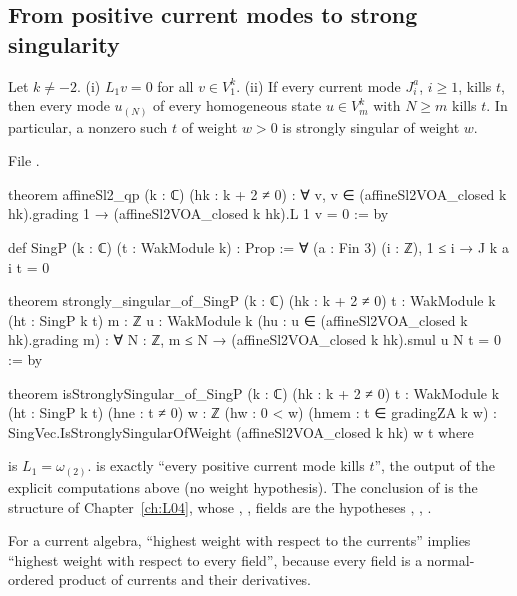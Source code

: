 \subsection{From positive current modes to strong singularity}

\begin{theorem}\label{l08:thm:strong}
Let $k\ne-2$. (i) $L_1v = 0$ for all $v\in V^k_1$. (ii) If every current mode $J^a_i$, $i\ge1$, kills $t$,
then every mode $u_{(N)}$ of every homogeneous state $u\in V^k_m$ with $N\ge m$ kills $t$. In particular,
a nonzero such $t$ of weight $w>0$ is strongly singular of weight $w$.
\end{theorem}

\noindent File .
\begin{leancode}
theorem affineSl2_qp (k : ℂ) (hk : k + 2 ≠ 0) :
    ∀ v, v ∈ (affineSl2VOA_closed k hk).grading 1 → (affineSl2VOA_closed k hk).L 1 v = 0 := by

def SingP (k : ℂ) (t : WakModule k) : Prop := ∀ (a : Fin 3) (i : ℤ), 1 ≤ i → J k a i t = 0

theorem strongly_singular_of_SingP (k : ℂ) (hk : k + 2 ≠ 0) {t : WakModule k} (ht : SingP k t)
    {m : ℤ} {u : WakModule k} (hu : u ∈ (affineSl2VOA_closed k hk).grading m) :
    ∀ N : ℤ, m ≤ N → (affineSl2VOA_closed k hk).smul u N t = 0 := by

theorem isStronglySingular_of_SingP (k : ℂ) (hk : k + 2 ≠ 0) {t : WakModule k}
    (ht : SingP k t) (hne : t ≠ 0) {w : ℤ} (hw : 0 < w) (hmem : t ∈ gradingZA k w) :
    SingVec.IsStronglySingularOfWeight (affineSl2VOA_closed k hk) w t where
\end{leancode}

\begin{dictionary}
 is $L_1 = \omega_{(2)}$.  is exactly ``every positive current mode kills $t$'',
the output of the explicit computations above (no weight hypothesis). The conclusion of
\allowbreak{}\allowbreak{} is the structure  of
Chapter~\ref{ch:L04}, whose , ,  fields are the
hypotheses , , .
\end{dictionary}

\begin{physics}
For a current algebra, ``highest weight with respect to the currents'' implies ``highest weight with
respect to every field'', because every field is a normal-ordered product of currents and their
derivatives.
\end{physics}


